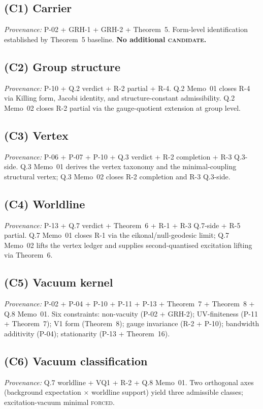 \documentclass[11pt,a4paper]{article}
\begin{document}
\subsection{(C1) Carrier} \textit{Provenance:} P-02 + GRH-1 + GRH-2 + Theorem~5. Form-level identification established by Theorem~5 baseline. \textbf{No additional \textsc{candidate}.}

\subsection{(C2) Group structure} \textit{Provenance:} P-10 + Q.2 verdict + R-2 partial + R-4. Q.2 Memo~01 closes R-4 via Killing form, Jacobi identity, and structure-constant admissibility. Q.2 Memo~02 closes R-2 partial via the gauge-quotient extension at group level.

\subsection{(C3) Vertex} \textit{Provenance:} P-06 + P-07 + P-10 + Q.3 verdict + R-2 completion + R-3 Q.3-side. Q.3 Memo~01 derives the vertex taxonomy and the minimal-coupling structural vertex; Q.3 Memo~02 closes R-2 completion and R-3 Q.3-side.

\subsection{(C4) Worldline} \textit{Provenance:} P-13 + Q.7 verdict + Theorem~6 + R-1 + R-3 Q.7-side + R-5 partial. Q.7 Memo~01 closes R-1 via the eikonal/null-geodesic limit; Q.7 Memo~02 lifts the vertex ledger and supplies second-quantised excitation lifting via Theorem~6.

\subsection{(C5) Vacuum kernel} \textit{Provenance:} P-02 + P-04 + P-10 + P-11 + P-13 + Theorem~7 + Theorem~8 + Q.8 Memo~01. Six constraints: non-vacuity (P-02 + GRH-2); UV-finiteness (P-11 + Theorem~7); V1 form (Theorem~8); gauge invariance (R-2 + P-10); bandwidth additivity (P-04); stationarity (P-13 + Theorem~16).

\subsection{(C6) Vacuum classification} \textit{Provenance:} Q.7 worldline + VQ1 + R-2 + Q.8 Memo~01. Two orthogonal axes (background expectation $\times$ worldline support) yield three admissible classes; excitation-vacuum minimal \textsc{forced}.
\end{document}
